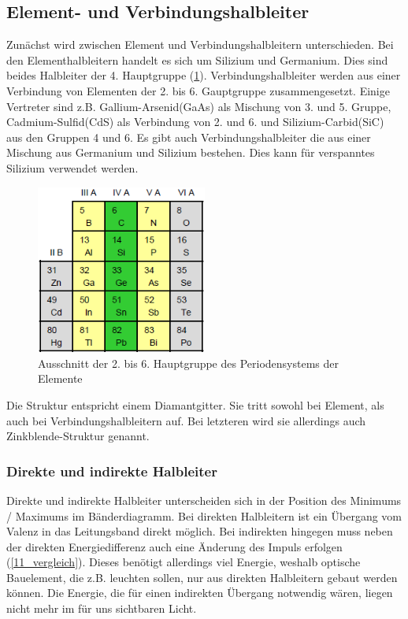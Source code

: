 \subsection{Element- und Verbindungshalbleiter}

	Zunächst wird zwischen Element und Verbindungshalbleitern unterschieden. Bei den Elementhalbleitern handelt es sich um Silizium und Germanium. Dies sind beides Halbleiter der 4. Hauptgruppe (\ref{11_perioden}). Verbindungshalbleiter werden aus einer Verbindung von Elementen der 2. bis 6. Gauptgruppe zusammengesetzt. Einige Vertreter sind z.B. Gallium-Arsenid(GaAs) als Mischung von 3. und 5. Gruppe, Cadmium-Sulfid(CdS) als Verbindung von 2. und 6. und Silizium-Carbid(SiC) aus den Gruppen 4 und 6. Es gibt auch Verbindungshalbleiter die aus einer Mischung aus Germanium und Silizium bestehen. Dies kann für verspanntes Silizium verwendet werden. 

	\begin{figure}[h]
		\centering
		\includegraphics[width=0.5\textwidth]{Kapitel/Kap11/periodensystem.png}
		\caption{Ausschnitt der 2. bis 6. Hauptgruppe des Periodensystems der Elemente}
		\label{11_perioden}
	\end{figure}

	Die Struktur entspricht einem Diamantgitter. Sie tritt sowohl bei Element, als auch bei Verbindungshalbleitern auf. Bei letzteren wird sie allerdings auch Zinkblende-Struktur genannt.

	\subsubsection{Direkte und indirekte Halbleiter}
	Direkte und indirekte Halbleiter unterscheiden sich in der Position des Minimums / Maximums im Bänderdiagramm. Bei direkten Halbleitern ist ein Übergang vom Valenz in das Leitungsband direkt möglich. Bei indirekten hingegen muss neben der direkten Energiedifferenz auch eine Änderung des Impuls erfolgen (\ref{11_vergleich}). Dieses benötigt allerdings viel Energie, weshalb optische Bauelement, die z.B. leuchten sollen, nur aus direkten Halbleitern gebaut werden können. Die Energie, die für einen indirekten Übergang notwendig wären, liegen nicht mehr im für uns sichtbaren Licht.
	
